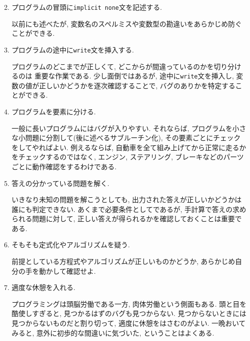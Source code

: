 \begin{enumerate}
\setcounter{enumi}{1}
\item プログラムの冒頭に\verb|implicit none|文を記述する.

以前にも述べたが,
変数名のスペルミスや変数型の勘違いをあらかじめ防ぐことができる.

\item プログラムの途中に\verb|write|文を挿入する.

プログラムのどこまでが正しくて, どこからが間違っているのかを切り分けるのは
重要な作業である.
少し面倒ではあるが, 途中に\verb|write|文を挿入し, 変数の値が正しいかどうかを逐次確認することで,
バグのありかを特定することができる.

\item プログラムを要素に分ける.

一般に長いプログラムにはバグが入りやすい.
それならば, プログラムを小さな小問題に分割して(後に述べるサブルーチン化),
その要素ごとにチェックをしてやればよい.
例えるならば, 自動車を全て組み上げてから正常に走るかをチェックするのではなく,
エンジン, ステアリング, ブレーキなどのパーツごとに動作確認をするわけである.

\item 答えの分かっている問題を解く.

いきなり未知の問題を解こうとしても, 出力された答えが正しいかどうかは誰にも判定できない.
あくまで必要条件としてであるが, 手計算で答えの求められる問題に対して,
正しい答えが得られるかを確認しておくことは重要である.

\item そもそも定式化やアルゴリズムを疑う.

前提としている方程式やアルゴリズムが正しいものかどうか,
あらかじめ自分の手を動かして確認せよ.

\item 適度な休憩を入れる.

プログラミングは頭脳労働である一方, 肉体労働という側面もある.
頭と目を酷使しすぎると, 見つかるはずのバグも見つからない.
見つからないときには見つからないものだと割り切って, 適度に休憩をはさむのがよい.
一晩おいてみると, 意外に初歩的な間違いに気づいた, ということはよくある.

\end{enumerate}




\begin{comment}
Fortranは文字も変数として扱うことができる(文字型: character).
文字の長さはcharacter(len=5)などとして指定する.
次のプログラムは文字型を扱った例である.



\subsection*{$<$演習課題$>$}
二辺の長さとそれらのなす角度を読み取り, その三角形の面積を計算するプログラムを作成せよ. \\
\end{comment}

\begin{comment}
異なる型同士の演算は文法エラーではないが,
避けることが望ましい.
以下のプログラムは, 整数型, 実数型, 複素数型間の型変換の例である.

\end{comment}
